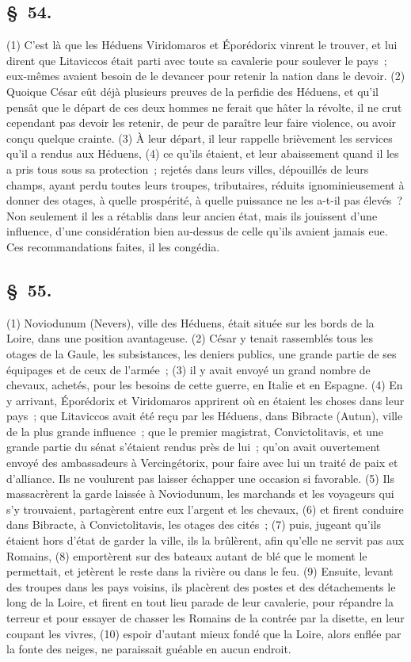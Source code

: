 \documentclass[french,twoside]{book} %
\begin{document}
\subsection[{§ 54.}]{ \textsc{§ 54.} }
\noindent (1) C'est là que les Héduens Viridomaros et Éporédorix vinrent le trouver, et lui dirent que Litaviccos était parti avec toute sa cavalerie pour soulever le pays ; eux-mêmes avaient besoin de le devancer pour retenir la nation dans le devoir. (2) Quoique César eût déjà plusieurs preuves de la perfidie des Héduens, et qu’il pensât que le départ de ces deux hommes ne ferait que hâter la révolte, il ne crut cependant pas devoir les retenir, de peur de paraître leur faire violence, ou avoir conçu quelque crainte. (3) À leur départ, il leur rappelle brièvement les services qu’il a rendus aux Héduens, (4) ce qu’ils étaient, et leur abaissement quand il les a pris tous sous sa protection ; rejetés dans leurs villes, dépouillés de leurs champs, ayant perdu toutes leurs troupes, tributaires, réduits ignominieusement à donner des otages, à quelle prospérité, à quelle puissance ne les a-t-il pas élevés ? Non seulement il les a rétablis dans leur ancien état, mais ils jouissent d’une influence, d’une considération bien au-dessus de celle qu’ils avaient jamais eue. Ces recommandations faites, il les congédia.
\subsection[{§ 55.}]{ \textsc{§ 55.} }
\noindent (1) Noviodunum (Nevers), ville des Héduens, était située sur les bords de la Loire, dans une position avantageuse. (2) César y tenait rassemblés tous les otages de la Gaule, les subsistances, les deniers publics, une grande partie de ses équipages et de ceux de l’armée ; (3) il y avait envoyé un grand nombre de chevaux, achetés, pour les besoins de cette guerre, en Italie et en Espagne. (4) En y arrivant, Éporédorix et Viridomaros apprirent où en étaient les choses dans leur pays ; que Litaviccos avait été reçu par les Héduens, dans Bibracte (Autun), ville de la plus grande influence ; que le premier magistrat, Convictolitavis, et une grande partie du sénat s’étaient rendus près de lui ; qu’on avait ouvertement envoyé des ambassadeurs à Vercingétorix, pour faire avec lui un traité de paix et d’alliance. Ils ne voulurent pas laisser échapper une occasion si favorable. (5) Ils massacrèrent la garde laissée à Noviodunum, les marchands et les voyageurs qui s’y trouvaient, partagèrent entre eux l’argent et les chevaux, (6) et firent conduire dans Bibracte, à Convictolitavis, les otages des cités ; (7) puis, jugeant qu’ils étaient hors d’état de garder la ville, ils la brûlèrent, afin qu’elle ne servit pas aux Romains, (8) emportèrent sur des bateaux autant de blé que le moment le permettait, et jetèrent le reste dans la rivière ou dans le feu. (9) Ensuite, levant des troupes dans les pays voisins, ils placèrent des postes et des détachements le long de la Loire, et firent en tout lieu parade de leur cavalerie, pour répandre la terreur et pour essayer de chasser les Romains de la contrée par la disette, en leur coupant les vivres, (10) espoir d’autant mieux fondé que la Loire, alors enflée par la fonte des neiges, ne paraissait guéable en aucun endroit.
\end{document}
